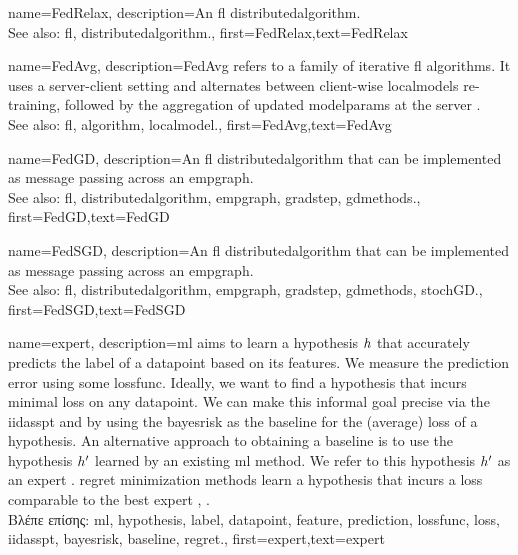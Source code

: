 {name={FedRelax},
	description={An \gls{fl} \gls{distributedalgorithm}. 
		\\ 
		See also: \gls{fl}, \gls{distributedalgorithm}.},
	first={FedRelax},text={FedRelax}
} 

{name={FedAvg},
	description={FedAvg refers to a family of iterative \gls{fl} \gls{algorithm}s. 
	It uses a server-client setting and alternates between client-wise \gls{localmodel}s
	re-training, followed by the aggregation of updated \gls{modelparams} at the server 
	\cite{pmlr-v54-mcmahan17a}. 
		\\ 
		See also: \gls{fl}, \gls{algorithm}, \gls{localmodel}.},
	first={FedAvg},text={Fed\-Avg}
} 

{name={FedGD},
	description={An \gls{fl} \gls{distributedalgorithm} that 
		can be implemented as message passing across an \gls{empgraph}. 
		\\ 
		See also: \gls{fl}, \gls{distributedalgorithm}, \gls{empgraph}, \gls{gradstep}, \gls{gdmethods}.},
	first={FedGD},text={FedGD}
} 

{name={FedSGD},
	description={An \gls{fl} \gls{distributedalgorithm} that 
		can be implemented as message passing across an \gls{empgraph}. 
		\\ 
		See also: \gls{fl}, \gls{distributedalgorithm}, \gls{empgraph}, \gls{gradstep}, \gls{gdmethods}, \gls{stochGD}.},
	first={FedSGD},text={FedSGD}
} 

{name={expert},
	description={\gls{ml} aims to learn a \gls{hypothesis} $h$ that accurately predicts the \gls{label} 
		of a \gls{datapoint} based on its \gls{feature}s. We measure the \gls{prediction} error using 
		some \gls{lossfunc}. Ideally, we want to find a \gls{hypothesis} that incurs minimal \gls{loss} 
		on any \gls{datapoint}. We can make this informal goal precise via the \gls{iidasspt} 
		and by using the \gls{bayesrisk} as the \gls{baseline} for the (average) \gls{loss} of a \gls{hypothesis}. 
		An alternative approach to obtaining a \gls{baseline} is to use the \gls{hypothesis} $h'$ learned 
		by an existing \gls{ml} method. We refer to this \gls{hypothesis} $h'$ as an expert \cite{PredictionLearningGames}. \Gls{regret} minimization methods learn a \gls{hypothesis}
		that incurs a \gls{loss} comparable to the best expert \cite{PredictionLearningGames}, \cite{HazanOCO}.\\
		\foreignlanguage{greek}{Βλέπε επίσης:} \gls{ml}, \gls{hypothesis}, \gls{label}, \gls{datapoint}, \gls{feature}, \gls{prediction}, \gls{lossfunc}, \gls{loss}, \gls{iidasspt}, \gls{bayesrisk}, \gls{baseline}, \gls{regret}.},
	first={expert},text={expert} 
}

